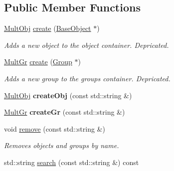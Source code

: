 \subsection*{Public Member Functions}
\begin{DoxyCompactItemize}
\item 
\hypertarget{classMultFS_aacf6a025364bd168fbd6dd37aaa6a152}{\hyperlink{classMultFS_a3862987abee233b7ea08a67abc80b245}{Mult\+Obj} \hyperlink{classMultFS_aacf6a025364bd168fbd6dd37aaa6a152}{create} (\hyperlink{classBaseObject}{Base\+Object} $\ast$)}\label{classMultFS_aacf6a025364bd168fbd6dd37aaa6a152}

\begin{DoxyCompactList}\small\item\em Adds a new object to the object container. Depricated. \end{DoxyCompactList}\item 
\hypertarget{classMultFS_abd99f17847032c1f667843e2bd72c57c}{\hyperlink{classMultFS_a0c5fea8cc8ab29c2624d5863cf75cc6f}{Mult\+Gr} \hyperlink{classMultFS_abd99f17847032c1f667843e2bd72c57c}{create} (\hyperlink{classGroup}{Group} $\ast$)}\label{classMultFS_abd99f17847032c1f667843e2bd72c57c}

\begin{DoxyCompactList}\small\item\em Adds a new group to the groups container. Depricated. \end{DoxyCompactList}\item 
\hypertarget{classMultFS_a96e45921965aa794c03c95d046a0f1b8}{\hyperlink{classMultFS_a3862987abee233b7ea08a67abc80b245}{Mult\+Obj} {\bfseries create\+Obj} (const std\+::string \&)}\label{classMultFS_a96e45921965aa794c03c95d046a0f1b8}

\item 
\hypertarget{classMultFS_a833b6278499d1e187f3828d39b936eaf}{\hyperlink{classMultFS_a0c5fea8cc8ab29c2624d5863cf75cc6f}{Mult\+Gr} {\bfseries create\+Gr} (const std\+::string \&)}\label{classMultFS_a833b6278499d1e187f3828d39b936eaf}

\item 
\hypertarget{classMultFS_a8f223d40df0273ae8eccfc15c8925765}{void \hyperlink{classMultFS_a8f223d40df0273ae8eccfc15c8925765}{remove} (const std\+::string \&)}\label{classMultFS_a8f223d40df0273ae8eccfc15c8925765}

\begin{DoxyCompactList}\small\item\em Removes objects and groups by name. \end{DoxyCompactList}\item 
\hypertarget{classMultFS_a7cee8ae014447fb24cf1efd5a3024101}{std\+::string \hyperlink{classMultFS_a7cee8ae014447fb24cf1efd5a3024101}{search} (const std\+::string \&) const }\label{classMultFS_a7cee8ae014447fb24cf1efd5a3024101}


\end{DoxyCompactItemize}
